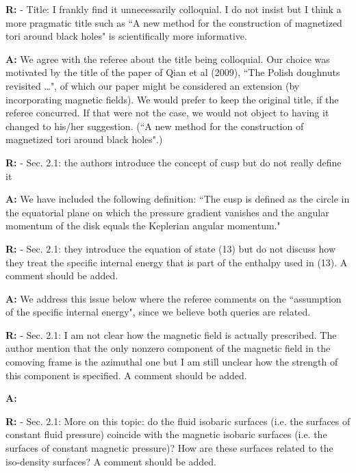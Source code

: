 \documentclass{article}
\begin{document}
\bigskip

{\bf R:} - Title: I frankly find it unnecessarily colloquial. I do not insist but
I think a more pragmatic title such as ``A new method for the
construction of magnetized tori around black holes" is scientifically
more informative.

\bigskip

{\bf A:} We agree with the referee about the title being colloquial. Our choice was
motivated by the title of the paper of Qian et al (2009), ``The Polish 
doughnuts revisited …", of which our paper might be considered an extension 
(by incorporating magnetic fields). We would prefer to keep the original 
title, if the referee concurred. If that were not the case, we would not
object to having it changed to his/her suggestion. (``A new method for the
construction of magnetized tori around black holes".)

\bigskip

{\bf R:} - Sec. 2.1: the authors introduce the concept of cusp but do not really
define it

\bigskip

{\bf A:} We have included the following definition: ``The cusp is defined as the circle 
in the equatorial plane on which the pressure gradient vanishes and the angular 
momentum of the disk equals the Keplerian angular momentum." 

\bigskip

{\bf R:} - Sec. 2.1: they introduce the equation of state (13) but do not discuss
how they treat the specific internal energy that is part of the
enthalpy used in (13). A comment should be added.

\bigskip

{\bf A:} We address this issue below where the referee comments on the ``assumption of the specific
internal energy", since we believe both queries are related.

\bigskip

{\bf R:} - Sec. 2.1: I am not clear how the magnetic field is actually
prescribed. The author mention that the only nonzero component of
the magnetic field in the comoving frame is the azimuthal one but I am
still unclear how the strength of this component is specified. A
comment should be added.

\bigskip

{\bf A:} 

\bigskip

{\bf R:} - Sec. 2.1: More on this topic: do the fluid isobaric surfaces (i.e. the
surfaces of constant fluid pressure) coincide with the magnetic
isobaric surfaces (i.e. the surfaces of constant magnetic pressure)?
How are these surfaces related to the iso-density surfaces? A comment
should be added.
\end{document}
